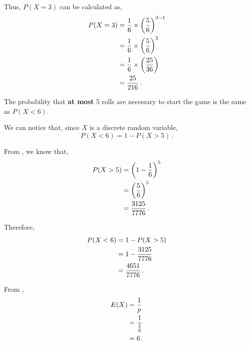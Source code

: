 \begin{subquestions}
\begin{subsubquestions}
Thus, $P(X=3)$ can be calculated as,
\begin{align}
	P(X = 3) & = \frac{1}{6} \times \left(\frac{5}{6} \right)^{3-1} \nonumber \\
	         & = \frac{1}{6} \times \left(\frac{5}{6} \right)^{2} \nonumber \\
	         & = \frac{1}{6} \times \left(\frac{25}{36} \right) \nonumber \\
	         & = \frac{25}{216} \,.
\end{align}


\subsubquestion

The probability that \textbf{at most} 5 rolls are necessary to start the game is the same as $P(X<6)$. 

We can notice that, since $X$ is a discrete random variable,
\begin{equation}
	P(X<6) = 1 - P(X>5) \,.
\end{equation}

From , we know that,
\begin{align}
	P(X>5) & = \left(1 - \frac{1}{6} \right)^5 \nonumber \\
	       & = \left(\frac{5}{6} \right)^5 \nonumber \\
	       & = \frac{3125}{7776} \,.
\end{align}

Therefore,
\begin{align}
	P(X<6) & = 1 - P(X>5) \nonumber \\
	       & = 1 - \frac{3125}{7776} \nonumber \\
	       & = \frac{4651}{7776} \,.
\end{align}


\subsubquestion

From ,
\begin{align}
	E(X) & = \frac{1}{p} \nonumber \\
	     & = \frac{1}{\frac{1}{6}} \nonumber \\
	     & = 6 \,.
\end{align}

\end{subsubquestions}



\end{subquestions}
